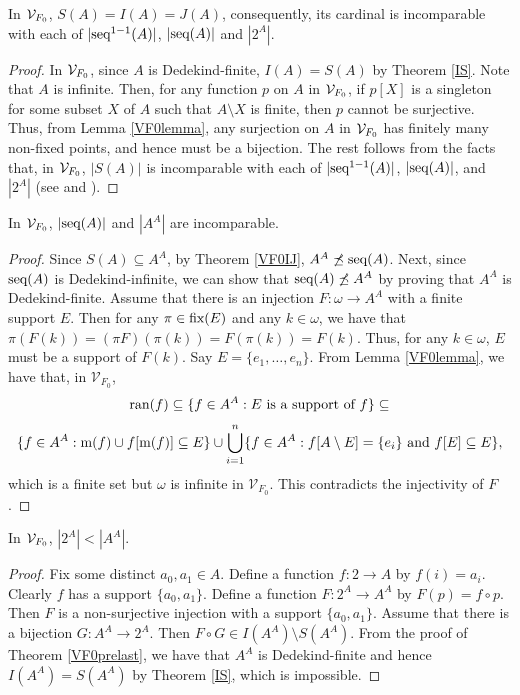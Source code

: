 \begin{theorem}\label{VF0IJ}
In $\mathcal{V}_{F_{0}}$, $S(A) = I(A) = J(A)$, consequently, its cardinal is incomparable with each of $|\textup{seq}^{1-1}(A)|$, $|\textup{seq}(A)|$ and $|2^A|$.
\end{theorem}

\begin{proof}
In $\mathcal{V}_{F_{0}}$, since $A$ is Dedekind-finite, $I(A)=S(A)$ by Theorem \ref{IS}. Note that $A$ is infinite. Then, for any function $p$ on $A$ in $\mathcal{V}_{F_{0}}$, if $p[X]$ is a singleton for some subset $X$ of $A$ such that $A\setminus X$ is finite, then $p$ cannot be surjective. Thus, from Lemma \ref{VF0lemma}, any surjection on $A$ in $\mathcal{V}_{F_{0}}$ has finitely many non-fixed points, and hence must be a bijection. The rest follows from the facts that, in $\mathcal{V}_{F_{0}}$, $|S(A)|$ is incomparable with each of $|\textup{seq}^{1-1}(A)|$, $|\textup{seq}(A)|$, and $|2^A|$ (see \cite[Theorem 3.1]{SonVej2019} and \cite[Theorem 2.17]{DH}).
\end{proof}

\begin{theorem}\label{VF0prelast}
In $\mathcal{V}_{F_{0}}$, $|\textup{seq}(A)|$ and $|A^A|$ are incomparable.
\end{theorem}

\begin{proof}
Since $S(A)\subseteq A^{A}$, by Theorem \ref{VF0IJ}, $A^{A}\not\preceq \textup{seq}(A)$. Next, since $\textup{seq}(A)$ is Dedekind-infinite, we can show that $\textup{seq}(A)\not\preceq A^{A}$ by proving that $A^{A}$ is Dedekind-finite. Assume that there is an injection $F:\omega\to A^{A}$ with a finite support $E$. Then for any $\pi\in \textup{fix}(E)$ and any $k\in\omega$, we have that $\pi(F(k))=(\pi F)(\pi(k))=F(\pi(k))=F(k)$. Thus, for any $k\in\omega$, $E$ must be a support of $F(k)$. Say $E=\{e_{1},\dotsc,e_{n}\}$. From Lemma \ref{VF0lemma}, we have that, in $\mathcal{V}_{F_{0}}$, $$\textup{ran}(f)\subseteq\{f\in A^{A}:E  \text{ is a support of }f \}\subseteq$$$$ \{f\in A^{A}:\textup{m}(f)\cup f[\textup{m}(f)]\subseteq E\}\cup \bigcup\limits^{n}_{i=1}\{f\in A^{A}:f[A\setminus E]=\{e_{i}\} \text{ and } f[E]\subseteq E\},$$ which is a finite set but $\omega$ is infinite in $\mathcal{V}_{F_{0}}$. This contradicts the injectivity of $F$.
\end{proof}

\begin{theorem}\label{VF0last}
In $\mathcal{V}_{F_{0}}$, $|2^{A}|<|A^{A}|$.
\end{theorem}

\begin{proof}
 Fix some distinct $a_{0},a_{1}\in A$. Define a function $f:2\to A$ by $f(i)=a_{i}$. Clearly $f$ has a support $\{a_{0},a_{1}\}$. Define a function $F:2^A \rightarrow A^A$ by $F(p)=f\circ p$. Then $F$ is a non-surjective injection with a support $\{a_{0},a_{1}\}$. Assume that there is a bijection $G:A^{A}\to 2^{A}$. Then $F\circ G\in I(A^{A})\setminus S(A^{A})$. From the proof of Theorem \ref{VF0prelast}, we have that $A^A$ is Dedekind-finite and hence $I(A^{A})= S(A^{A})$ by Theorem \ref{IS}, which is impossible.
\end{proof}





